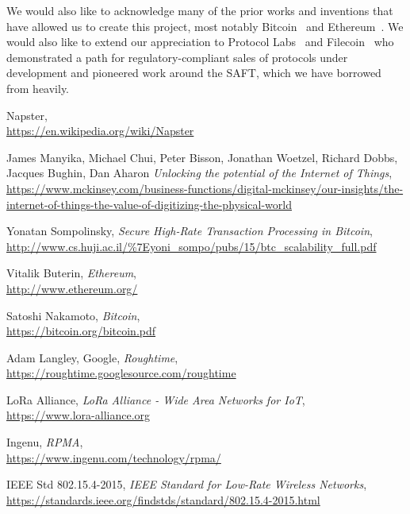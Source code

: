 \documentclass[letterpaper,11pt]{article}
\begin{document}
We would also like to acknowledge many of the prior works and inventions that have allowed us to create this project, most notably Bitcoin~\cite{bitcoin} and Ethereum~\cite{ethereum}. We would also like to extend our appreciation to Protocol Labs~\cite{protocol} and Filecoin~\cite{filecoin} who demonstrated a path for regulatory-compliant sales of protocols under development and pioneered work around the SAFT, which we have borrowed from heavily.
\newpage

\begin{thebibliography}{9}

    Napster, \\
        \url{https://en.wikipedia.org/wiki/Napster}

    James Manyika, Michael Chui, Peter Bisson, Jonathan Woetzel, Richard Dobbs, Jacques Bughin, Dan Aharon
        \emph{Unlocking the potential of the Internet of Things}, \\
        \url{https://www.mckinsey.com/business-functions/digital-mckinsey/our-insights/the-internet-of-things-the-value-of-digitizing-the-physical-world}

    Yonatan Sompolinsky,
        \emph{Secure High-Rate Transaction Processing in Bitcoin}, \\
        \url{http://www.cs.huji.ac.il/\%7Eyoni\_sompo/pubs/15/btc\_scalability\_full.pdf}

    Vitalik Buterin,
        \emph{Ethereum},\\
        \url{http://www.ethereum.org/}

    Satoshi Nakamoto,
        \emph{Bitcoin}, \\
        \url{https://bitcoin.org/bitcoin.pdf}

    Adam Langley, Google,
        \emph{Roughtime}, \\
        \url{https://roughtime.googlesource.com/roughtime}

    LoRa Alliance,
        \emph{LoRa Alliance - Wide Area Networks for IoT}, \\
        \url{https://www.lora-alliance.org}

    Ingenu,
        \emph{RPMA}, \\
        \url{https://www.ingenu.com/technology/rpma/}

    IEEE Std 802.15.4-2015,
        \emph{IEEE Standard for Low-Rate Wireless Networks}, \\
        \url{https://standards.ieee.org/findstds/standard/802.15.4-2015.html}


\end{thebibliography}
\end{document}
